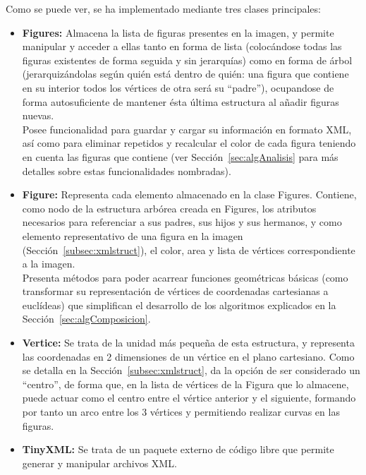 		
	Como se puede ver, se ha implementado mediante tres clases principales:
	
	\begin{itemize}
	
		\item \textbf{Figures:} Almacena la lista de figuras presentes en la imagen, y permite manipular y acceder a ellas tanto en forma de lista (colocándose todas las figuras existentes de forma seguida y sin jerarquías) como en forma de árbol (jerarquizándolas según quién está dentro de quién: una figura que contiene en su interior todos los vértices de otra será su ``padre''), ocupandose de forma autosuficiente de mantener ésta última estructura al añadir figuras nuevas.\\
	
		Posee funcionalidad para guardar y cargar su información en formato XML, así como para eliminar repetidos y recalcular el color de cada figura teniendo en cuenta las figuras que contiene (ver Sección~\ref{sec:algAnalisis} para más detalles sobre estas funcionalidades nombradas).
		
		\item \textbf{Figure:} Representa cada elemento almacenado en la clase Figures. Contiene, como nodo de la estructura arbórea creada en Figures, los atributos necesarios para referenciar a sus padres, sus hijos y sus hermanos, y como elemento representativo de una figura en la imagen (Sección~\ref{subsec:xmlstruct}), el color, area y lista de vértices correspondiente a la imagen.\\
		
		Presenta métodos para poder acarrear funciones geométricas básicas (como transformar su representación de vértices de coordenadas cartesianas a euclídeas) que simplifican el desarrollo de los algoritmos explicados en la Sección~\ref{sec:algComposicion}.
		
		\item \textbf{Vertice:} Se trata de la unidad más pequeña de esta estructura, y representa las coordenadas en 2 dimensiones de un vértice en el plano cartesiano. Como se detalla en la Sección~\ref{subsec:xmlstruct}, da la opción de ser considerado un ``centro'', de forma que, en la lista de vértices de la Figura que lo almacene, puede actuar como el centro entre el vértice anterior y el siguiente, formando por tanto un arco entre los 3 vértices y permitiendo realizar curvas en las figuras.
		
		\item \textbf{TinyXML:} Se trata de un paquete externo de código libre que permite generar y manipular archivos XML.
	
	\end{itemize}
	
